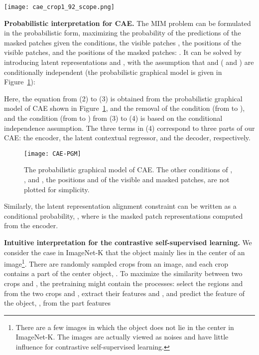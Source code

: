 \documentclass[twocolumn]{svjour3}          \smartqed  \usepackage{graphicx}
\begin{document}
\begin{figure*}[t]
\texttt{[image: cae\_crop1\_92\_scope.png]}~~
\\
\caption{The attention maps over two sets of randomly cropped images (the st the th rows)
for MoCo v3 (the nd the th rows), MAE (the rd the th rows), and our CAE (the th the th rows)
pretrained on ImageNet-K.
The contrastive self-supervised learning method, MoCo v3, tends to focus 
mainly on the object region 
and little on other regions.
In contrast, MIM-based models, CAE and MAE, tend to consider
almost all the patches.
The attention maps over the original images
are shown in Figure~\ref{fig:patchimportance}.}
\label{fig:patchimportance_crop}
\end{figure*}



\vspace{1mm}
\noindent\textbf{Probabilistic interpretation for CAE.}
The MIM problem can be formulated 
in the probabilistic form, maximizing
the probability of the predictions  
of the masked patches
given the conditions, the visible patches ,
the positions  of the visible patches,
and the positions  of the masked patches:
.
It can be solved by 
introducing latent representations 
and ,
with the assumption 
that 
and  
(
and ) are conditionally independent
(the probabilistic graphical model is 
given in Figure~\ref{fig:CAEPGM}):

Here,
the equation from (2) to (3)
is obtained from the probabilistic graphical model
of CAE shown in Figure~\ref{fig:CAEPGM},
and the removal of the condition 
(from 
to ),
and the condition 
(from 
to )
from (3) to (4)
is based on the conditional independence assumption.
The three terms in (4)
correspond to three parts of our CAE:
the encoder,
the latent contextual regressor,
and the decoder, respectively.

\begin{figure}
\centering
\footnotesize
\texttt{[image: CAE-PGM]}
\caption{The probabilistic graphical model of CAE.
The other conditions
of ,
,
and ,
the positions 
and  
of the visible and masked patches,
are not plotted for simplicity.}
\label{fig:CAEPGM}
\end{figure}


Similarly, the latent representation alignment constraint
can be written as a conditional probability,
,
where  is the masked patch representations
computed from the encoder.


\vspace{1mm}
\noindent\textbf{Intuitive interpretation for the contrastive self-supervised learning.}
We consider the case in ImageNet-K that the object mainly lies in the center of an image\footnote{There are a few images
in which the object does not lie in the center in ImageNet-K.
The images are actually viewed as noises
and have little influence for contrastive self-supervised learning.
}.
There are  randomly sampled crops from an image,
and each crop  contains a part of the center object, .
To maximize
the similarity between
two crops  and ,
the pretraining 
might contain the processes:
select the regions 
and 
from the two crops  and ,
extract their features 
and ,
and predict the feature of the object, ,
from the part features
\end{document}
